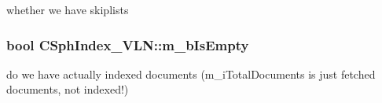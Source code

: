 whether we have skiplists 

\hypertarget{classCSphIndex__VLN_aee6349cca972ae11c1e8aca95a7e95e9}{
\subsubsection[{m\-\_\-b\-Is\-Empty}]{\setlength{\rightskip}{0pt plus 5cm}bool C\-Sph\-Index\-\_\-\-V\-L\-N\-::m\-\_\-b\-Is\-Empty\hspace{0.3cm}{\ttfamily [private]}}}\label{classCSphIndex__VLN_aee6349cca972ae11c1e8aca95a7e95e9}


do we have actually indexed documents (m\-\_\-i\-Total\-Documents is just fetched documents, not indexed!) 

